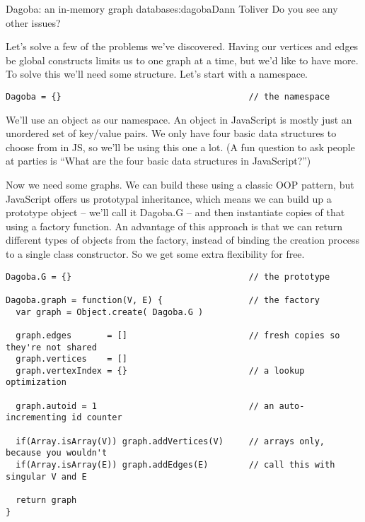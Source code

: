\begin{aosachapter}{Dagoba: an in-memory graph database}{s:dagoba}{Dann Toliver}
Do you see any other issues?

\label{build-a-better-graph}

Let's solve a few of the problems we've discovered. Having our vertices
and edges be global constructs limits us to one graph at a time, but
we'd like to have more. To solve this we'll need some structure. Let's
start with a namespace.

\begin{verbatim}
Dagoba = {}                                     // the namespace
\end{verbatim}

We'll use an object as our namespace. An object in JavaScript is mostly
just an unordered set of key/value pairs. We only have four basic data
structures to choose from in JS, so we'll be using this one a lot. (A
fun question to ask people at parties is ``What are the four basic data
structures in JavaScript?'')

Now we need some graphs. We can build these using a classic OOP pattern,
but JavaScript offers us prototypal inheritance, which means we can
build up a prototype object -- we'll call it Dagoba.G -- and then
instantiate copies of that using a factory function. An advantage of
this approach is that we can return different types of objects from the
factory, instead of binding the creation process to a single class
constructor. So we get some extra flexibility for free.

\begin{verbatim}
Dagoba.G = {}                                   // the prototype

Dagoba.graph = function(V, E) {                 // the factory
  var graph = Object.create( Dagoba.G )

  graph.edges       = []                        // fresh copies so they're not shared
  graph.vertices    = []
  graph.vertexIndex = {}                        // a lookup optimization
  
  graph.autoid = 1                              // an auto-incrementing id counter
  
  if(Array.isArray(V)) graph.addVertices(V)     // arrays only, because you wouldn't
  if(Array.isArray(E)) graph.addEdges(E)        // call this with singular V and E
  
  return graph
}
\end{verbatim}


\end{aosachapter}
